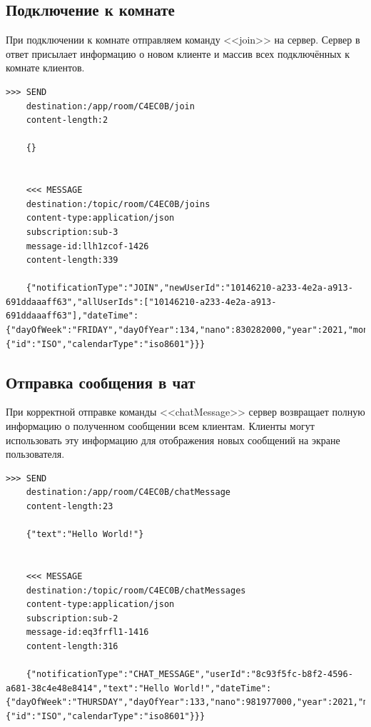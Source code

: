 \documentclass{../../includes/TechDoc}
\begin{document}
    \subsection{Подключение к комнате}

    При подключении к комнате отправляем команду <<join>> на сервер.
    Сервер в ответ присылает информацию о новом клиенте и массив всех подключённых к комнате клиентов.

    \begin{lstlisting}[language=text,caption={Запрос и ответ при входе в комнату}]
    >>> SEND
    destination:/app/room/C4EC0B/join
    content-length:2

    {}


    <<< MESSAGE
    destination:/topic/room/C4EC0B/joins
    content-type:application/json
    subscription:sub-3
    message-id:llh1zcof-1426
    content-length:339

    {"notificationType":"JOIN","newUserId":"10146210-a233-4e2a-a913-691ddaaaff63","allUserIds":["10146210-a233-4e2a-a913-691ddaaaff63"],"dateTime":{"dayOfWeek":"FRIDAY","dayOfYear":134,"nano":830282000,"year":2021,"monthValue":5,"dayOfMonth":14,"hour":0,"minute":3,"second":58,"month":"MAY","chronology":{"id":"ISO","calendarType":"iso8601"}}}
    \end{lstlisting}

    \subsection{Отправка сообщения в чат}

    При корректной отправке команды <<chatMessage>> сервер возвращает полную информацию о полученном сообщении всем клиентам.
    Клиенты могут использовать эту информацию для отображения новых сообщений на экране пользователя.

    \begin{lstlisting}[language=text,caption={Запрос и ответ при отправке сообщения в чат}]
    >>> SEND
    destination:/app/room/C4EC0B/chatMessage
    content-length:23

    {"text":"Hello World!"}


    <<< MESSAGE
    destination:/topic/room/C4EC0B/chatMessages
    content-type:application/json
    subscription:sub-2
    message-id:eq3frfl1-1416
    content-length:316

    {"notificationType":"CHAT_MESSAGE","userId":"8c93f5fc-b8f2-4596-a681-38c4e48e8414","text":"Hello World!","dateTime":{"dayOfWeek":"THURSDAY","dayOfYear":133,"nano":981977000,"year":2021,"monthValue":5,"dayOfMonth":13,"hour":22,"minute":46,"second":55,"month":"MAY","chronology":{"id":"ISO","calendarType":"iso8601"}}}
    \end{lstlisting}
\end{document}
